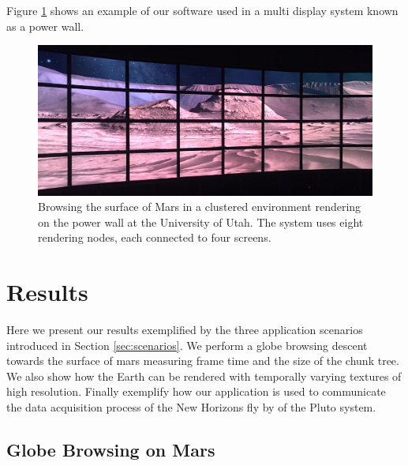 \documentclass[journal]{vgtc}                %
\newcommand{\anderscomment}[1]{\textbf{[-Anders-~}
    \textcolor{cyan}{#1}
    \textbf{~]}}
\begin{document}
Figure \ref{fig:power_wall} shows an example of our software used in a multi display system known as a power wall.

\begin{figure}
    \centering
    	\includegraphics[width=1.0\linewidth]{figures/power_wall.jpg}
        \caption{Browsing the surface of Mars in a clustered environment rendering on the power wall at the University of Utah. The system uses eight rendering nodes, each connected to four screens.}  \vspace{-4mm}
    \label{fig:power_wall}
\end{figure}

\section{Results}

Here we present our results exemplified by the three application scenarios introduced in Section \ref{sec:scenarios}. We perform a globe browsing descent towards the surface of mars measuring frame time and the size of the chunk tree. We also show how the Earth can be rendered with temporally varying textures of high resolution. Finally exemplify how our application is used to communicate the data acquisition process of the New Horizons fly by of the Pluto system.

\subsection{Globe Browsing on Mars}
\end{document}
